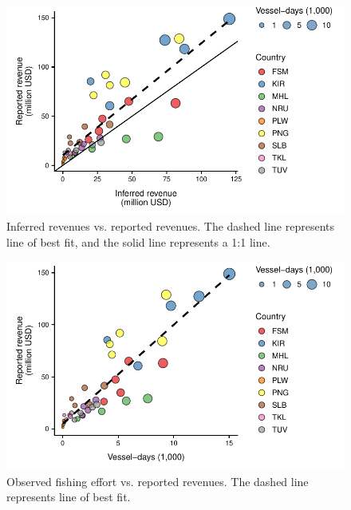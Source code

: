 \documentclass[12pt]{article}
\begin{document}
\begin{figure}
\centering
	\includegraphics{img/revenue_FFA_GFW_linear.pdf}
	\caption{\label{fig:revenue_FFA_GFW_linear}Inferred revenues vs. reported revenues. The dashed line represents line of best fit, and the solid line represents a 1:1 line.}
\end{figure}

\begin{figure}
\centering
	\includegraphics{img/revenue_FFA_effort_GFW.pdf}
	\caption{\label{fig:revenue_FFA_effort_GFW}Observed fishing effort vs. reported revenues. The dashed line represents line of best fit.}
\end{figure}
\end{document}
